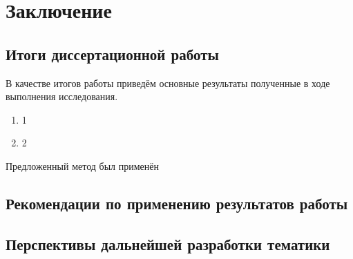 \chapter*{Заключение}                       %

\section*{Итоги диссертационной работы}

В качестве итогов работы приведём основные результаты полученные в ходе выполнения исследования.

\begin{enumerate}
    \item 1
    \item 2
\end{enumerate}

Предложенный метод был применён 

\section*{Рекомендации по применению результатов работы}


\section*{Перспективы дальнейшей разработки тематики}

\clearpage
